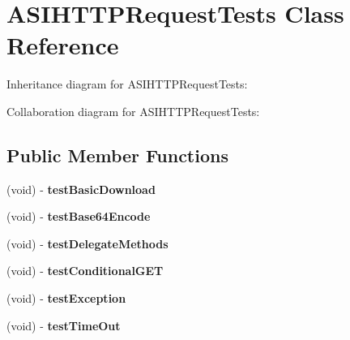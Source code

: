 \hypertarget{interface_a_s_i_h_t_t_p_request_tests}{
\section{\-A\-S\-I\-H\-T\-T\-P\-Request\-Tests \-Class \-Reference}
\label{interface_a_s_i_h_t_t_p_request_tests}
}


\-Inheritance diagram for \-A\-S\-I\-H\-T\-T\-P\-Request\-Tests\-:


\-Collaboration diagram for \-A\-S\-I\-H\-T\-T\-P\-Request\-Tests\-:
\subsection*{\-Public \-Member \-Functions}
\begin{DoxyCompactItemize}
\item 
\hypertarget{interface_a_s_i_h_t_t_p_request_tests_aeac324a706cb5b14402328ebfc9d5261}{
(void) -\/ {\bfseries test\-Basic\-Download}}
\label{interface_a_s_i_h_t_t_p_request_tests_aeac324a706cb5b14402328ebfc9d5261}

\item 
\hypertarget{interface_a_s_i_h_t_t_p_request_tests_a349b42dabf7c0b0ab4e91d6a64e9b114}{
(void) -\/ {\bfseries test\-Base64\-Encode}}
\label{interface_a_s_i_h_t_t_p_request_tests_a349b42dabf7c0b0ab4e91d6a64e9b114}

\item 
\hypertarget{interface_a_s_i_h_t_t_p_request_tests_aa39b9f3da400627335f9610d01f0d66f}{
(void) -\/ {\bfseries test\-Delegate\-Methods}}
\label{interface_a_s_i_h_t_t_p_request_tests_aa39b9f3da400627335f9610d01f0d66f}

\item 
\hypertarget{interface_a_s_i_h_t_t_p_request_tests_a07516d109d01a5b07189e2445fbe5c3b}{
(void) -\/ {\bfseries test\-Conditional\-G\-E\-T}}
\label{interface_a_s_i_h_t_t_p_request_tests_a07516d109d01a5b07189e2445fbe5c3b}

\item 
\hypertarget{interface_a_s_i_h_t_t_p_request_tests_adc7ef34449a4bde6d5bf324c8f3b8ff2}{
(void) -\/ {\bfseries test\-Exception}}
\label{interface_a_s_i_h_t_t_p_request_tests_adc7ef34449a4bde6d5bf324c8f3b8ff2}

\item 
\hypertarget{interface_a_s_i_h_t_t_p_request_tests_af208856d8090d9e5e86a2142bbb41513}{
(void) -\/ {\bfseries test\-Time\-Out}}
\label{interface_a_s_i_h_t_t_p_request_tests_af208856d8090d9e5e86a2142bbb41513}


\end{DoxyCompactItemize}
